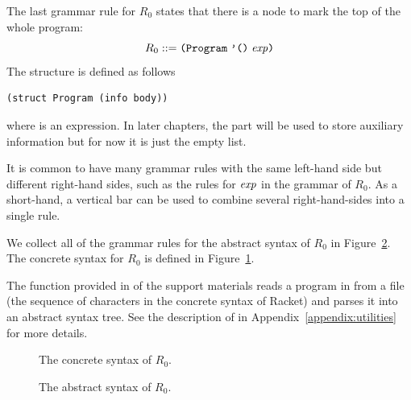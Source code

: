 \documentclass[11pt]{book}
\begin{document}
The last grammar rule for $R_0$ states that there is a 
node to mark the top of the whole program:
\[
  R_0 ::= \texttt{(Program}\;\texttt{'()}\;\mathit{exp}\texttt{)}
\]
The  structure is defined as follows
\begin{lstlisting}
(struct Program (info body))
\end{lstlisting}
where  is an expression. In later chapters, the 
part will be used to store auxiliary information but for now it is
just the empty list.

It is common to have many grammar rules with the same left-hand side
but different right-hand sides, such as the rules for $\mathit{exp}$ in the
grammar of $R_0$. As a short-hand, a vertical bar can be used to
combine several right-hand-sides into a single rule.

We collect all of the grammar rules for the abstract syntax of $R_0$
in Figure~\ref{fig:r0-syntax}. The concrete syntax for $R_0$ is
defined in Figure~\ref{fig:r0-concrete-syntax}.

The  function provided in  of
the support materials reads a program in from a file (the sequence of
characters in the concrete syntax of Racket) and parses it into an
abstract syntax tree. See the description of  in
Appendix~\ref{appendix:utilities} for more details.


\begin{figure}[tp]
\caption{The concrete syntax of $R_0$.}
\label{fig:r0-concrete-syntax}
\end{figure}

\begin{figure}[tp]
\caption{The abstract syntax of $R_0$.}
\label{fig:r0-syntax}
\end{figure}
\end{document}
